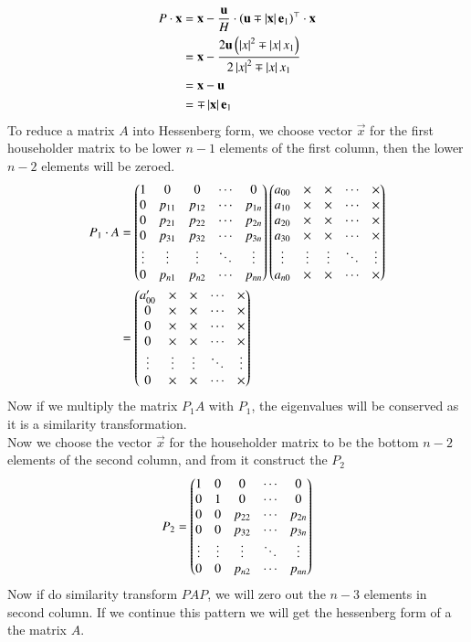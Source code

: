 \documentclass[a4paper,12pt]{article}
\theoremstyle{remark}
\begin{document}
\begin{align}
	P\cdot\mathbf{x} &= \mathbf{x} - \frac{\mathbf{u}}{H}\cdot\left(\mathbf{u}\mp \left\vert\mathbf{x}\right\vert\mathbf{e}_1\right)^\top\cdot \mathbf{x}\\
	              &= \mathbf{x} - \frac{2\mathbf{u}\left(\left\vert x\right\vert^2\mp \left\vert x\right\vert x_1\right)}{2\left\vert x\right\vert^2\mp \left\vert x\right\vert x_1}\\
	              &= \mathbf{x} - \mathbf{u}\\
	              &= \mp\left\vert\mathbf{x}\right\vert\mathbf{e}_1
\end{align}
To reduce a matrix $A$ into Hessenberg form, we choose vector $\vec{x}$ for the first householder matrix to be lower $n-1$ elements of the first column, then the lower $n-2$ elements will be zeroed.
\begin{align}
P_1\cdot A &= \begin{pmatrix}
1 & 0 & 0 & \cdots & 0 \\
0 & p_{11} & p_{12} & \cdots & p_{1n} \\
0      & p_{21} & p_{22} & \cdots & p_{2n} \\
0      & p_{31} & p_{32} & \cdots & p_{3n} \\
\vdots & \vdots & \vdots & \ddots & \vdots \\
0      & p_{n1} & p_{n2} & \cdots & p_{nn}
\end{pmatrix}\begin{pmatrix}
a_{00} & \times & \times & \cdots & \times \\
a_{10} & \times & \times & \cdots & \times \\
a_{20} & \times & \times & \cdots & \times \\
a_{30} & \times & \times & \cdots & \times \\
\vdots & \vdots & \vdots & \ddots & \vdots \\
a_{n0} & \times & \times & \cdots & \times
\end{pmatrix}\\
&=\begin{pmatrix}
a_{00}^\prime & \times & \times & \cdots & \times \\
0 & \times & \times & \cdots & \times \\
0      & \times & \times & \cdots & \times \\
0      & \times   & \times & \cdots & \times \\
\vdots & \vdots & \vdots & \ddots & \vdots \\
0      & \times      & \times      & \cdots & \times
\end{pmatrix}
\end{align}
Now if we multiply the matrix $P_1A$ with $P_1$, the eigenvalues will be conserved as it is a similarity transformation.\\
Now we choose the vector $\vec{x}$ for the householder matrix to be the bottom $n-2$ elements of the second column, and from it construct the $P_2$
\begin{align}
P_2 = \begin{pmatrix}
1 & 0 & 0 & \cdots & 0 \\
0 & 1 & 0 & \cdots & 0 \\
0 & 0 & p_{22} & \cdots & p_{2n} \\
0 & 0 & p_{32} & \cdots & p_{3n} \\
\vdots & \vdots & \vdots & \ddots & \vdots \\
0 & 0 & p_{n2} & \cdots & p_{nn}
\end{pmatrix}
\end{align}
Now if do similarity transform $PAP$, we will zero out the $n-3$ elements in second column.
If we continue this pattern we will get the hessenberg form of a the matrix $A$.
\end{document}
